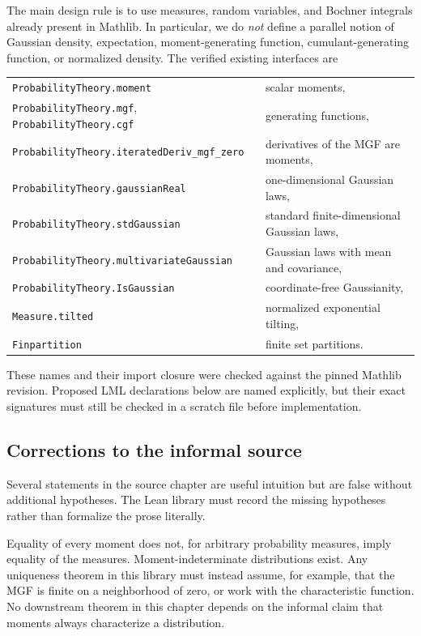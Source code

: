 The main design rule is to use measures, random variables, and Bochner integrals already present
in Mathlib.  In particular, we do \emph{not} define a parallel notion of Gaussian density,
expectation, moment-generating function, cumulant-generating function, or normalized density.
The verified existing interfaces are
\begin{center}
\begin{tabular}{ll}
\texttt{ProbabilityTheory.moment} & scalar moments,\\
\texttt{ProbabilityTheory.mgf}, \texttt{ProbabilityTheory.cgf} & generating functions,\\
\texttt{ProbabilityTheory.iteratedDeriv\_mgf\_zero} & derivatives of the MGF are moments,\\
\texttt{ProbabilityTheory.gaussianReal} & one-dimensional Gaussian laws,\\
\texttt{ProbabilityTheory.stdGaussian} & standard finite-dimensional Gaussian laws,\\
\texttt{ProbabilityTheory.multivariateGaussian} & Gaussian laws with mean and covariance,\\
\texttt{ProbabilityTheory.IsGaussian} & coordinate-free Gaussianity,\\
\texttt{Measure.tilted} & normalized exponential tilting,\\
\texttt{Finpartition} & finite set partitions.
\end{tabular}
\end{center}
These names and their import closure were checked against the pinned Mathlib revision.  Proposed
LML declarations below are named explicitly, but their exact signatures must still be checked in
a scratch file before implementation.

\subsection{Corrections to the informal source}

Several statements in the source chapter are useful intuition but are false without additional
hypotheses.  The Lean library must record the missing hypotheses rather than formalize the prose
literally.

\begin{remark}
Equality of every moment does not, for arbitrary probability measures, imply equality of the
measures.  Moment-indeterminate distributions exist.  Any uniqueness theorem in this library must
instead assume, for example, that the MGF is finite on a neighborhood of zero, or work with the
characteristic function.  No downstream theorem in this chapter depends on the informal claim
that moments always characterize a distribution.
\end{remark}

